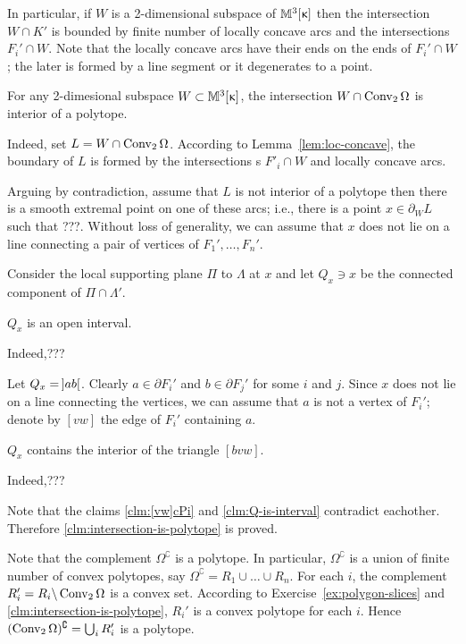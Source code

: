 In particular, if $W$ is a 2-dimensional subspace of $\mathbb{M}_{{}}^{3}[{\upkappa}]$ 
then the intersection $W\cap K'$ is bounded 
by finite number of locally concave arcs and the  intersections $F_i'\cap W$.
Note that the locally concave arcs have their ends on the ends of $F_i'\cap W$;
the later is formed by a line segment or it degenerates to a point.

\begin{clm}{}\label{clm:intersection-is-polytope}
For any 2-dimesional subspace $W\subset\Lob{3}{\kappa}$,
the intersection $W\cap \Conv_2 \Omega$ is interior of a polytope.
\end{clm}

Indeed, set $L=W\cap \Conv_2 \Omega$.
According to Lemma~\ref{lem:loc-concave}, 
the boundary of $L$ is formed by the intersections s $F'_i\cap W$
and locally concave arcs.

Arguing by contradiction, 
assume that $L$ is not interior of a polytope then there is a smooth extremal point on one of these arcs; i.e., there is a point $x\in\partial_W L$ such that ???.
Without loss of generality, we can assume that $x$ does not lie on a line connecting a pair of vertices of $F_1',\dots,F_n'$.

Consider the local supporting plane $\Pi$ to $\Lambda$ at $x$
and let $Q_x\ni x$ be the connected component of $\Pi\cap\Lambda'$.

\begin{clm}{}\label{clm:Q-is-interval}
$Q_x$ is an open interval. 
\end{clm}

Indeed,???\claimqeds

Let $Q_x=\hskip-0.1em\left]ab\right[$.
Clearly $a\in\partial F_i'$ and $b\in\partial F_j'$
for some $i$ and $j$.
Since $x$ does not lie on a line connecting the vertices,
we can assume that $a$ is not a vertex of $F_i'$;
denote by $[vw]$ the edge of $F_i'$ containing $a$.

\begin{clm}{}\label{clm:[vw]cPi}
$Q_x$ contains the interior of the triangle $[bvw]$.
\end{clm}

Indeed,???\claimqeds

Note that the claims \ref{clm:[vw]cPi} and \ref{clm:Q-is-interval} contradict eachother.
Therefore \ref{clm:intersection-is-polytope} is proved.


Note that the complement $\Omega^\complement$ is a polytope.
In particular, $\Omega^\complement$ is a union of finite number of convex polytopes,
say 
$\Omega^\complement=R_1\cup\dots\cup R_n$.
For each $i$, the complement $R_i'=R_i\backslash \mathop{\rm Conv}\nolimits_2\Omega$ is a convex set.
According to 
Exercise~\ref{ex:polygon-slices} 
and \ref{clm:intersection-is-polytope}, 
$R_i'$ is a convex polytope for each $i$.
Hence $(\mathop{\rm Conv}\nolimits_2\Omega)^\complement=\bigcup_i R_i'$ is a polytope.
\qeds

